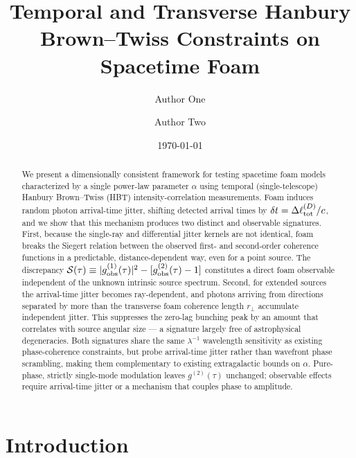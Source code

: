 \documentclass[aps,prd,onecolumn,amsmath,amssymb]{revtex4-2}
\begin{document}
\title{Temporal and Transverse Hanbury Brown--Twiss Constraints on Spacetime Foam}

\author{Author One}

\author{Author Two}

\date{\today}

\begin{abstract}
We present a dimensionally consistent framework for testing spacetime foam models
characterized by a single power-law parameter $\alpha$ using temporal
(single-telescope) Hanbury Brown--Twiss (HBT) intensity-correlation measurements.
Foam induces random photon arrival-time jitter, shifting detected arrival times by
$\delta t = \Delta\ell_{\rm tot}^{(D)}/c$, and we show that this mechanism produces
two distinct and observable signatures.
First, because the single-ray and differential jitter kernels are not identical,
foam breaks the Siegert relation between the observed first- and second-order
coherence functions in a predictable, distance-dependent way, even for a point
source.
The discrepancy $\mathcal{S}(\tau) \equiv |g^{(1)}_{\rm obs}(\tau)|^2 -
[g^{(2)}_{\rm obs}(\tau)-1]$ constitutes a direct foam observable independent
of the unknown intrinsic source spectrum.
Second, for extended sources the arrival-time jitter becomes ray-dependent,
and photons arriving from directions separated by more than the transverse foam
coherence length $r_\perp$ accumulate independent jitter.
This suppresses the zero-lag bunching peak by an amount that correlates with
source angular size — a signature largely free of astrophysical degeneracies.
Both signatures share the same $\lambda^{-1}$ wavelength sensitivity as
existing phase-coherence constraints, but probe arrival-time jitter rather
than wavefront phase scrambling, making them complementary to existing
extragalactic bounds on $\alpha$.
Pure-phase, strictly single-mode modulation leaves $g^{(2)}(\tau)$ unchanged;
observable effects require arrival-time jitter or a mechanism that couples
phase to amplitude.
\end{abstract}

\maketitle

\section{Introduction}
\label{sec:intro}
\end{document}

